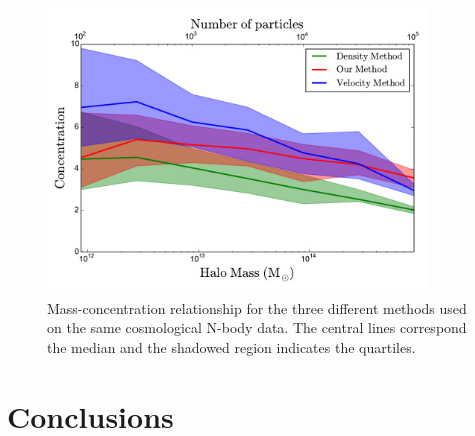\documentclass{emulateapj}
\begin{document}
\begin{figure}
\begin{center}
  \includegraphics[width=0.90\textwidth]{concentration.pdf}
\end{center}
\caption{Mass-concentration relationship for the three different
  methods used on the same cosmological N-body data. The central lines
  correspond the median and the shadowed region indicates the
  quartiles.
    \label{fig:concentration}}
\end{figure}




\section{Conclusions}
\label{sec:conclusions}




\end{document}

